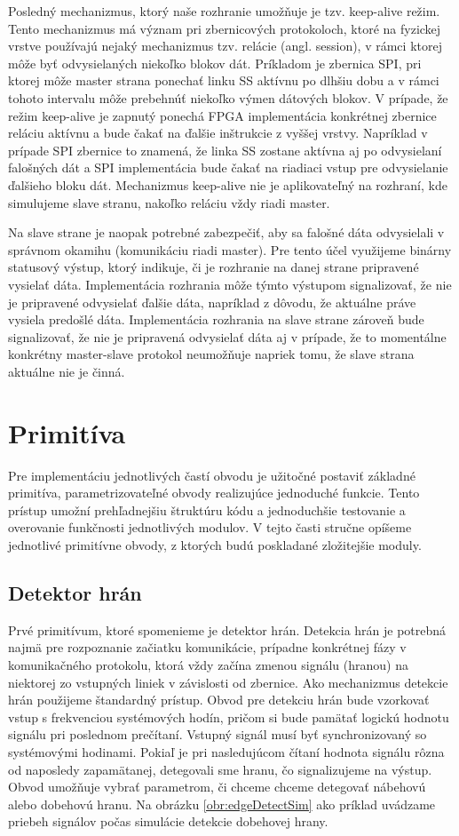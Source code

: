 Posledný mechanizmus, ktorý naše rozhranie umožňuje je tzv. keep-alive režim. Tento mechanizmus má význam pri zbernicových protokoloch, ktoré na fyzickej vrstve používajú nejaký mechanizmus tzv. relácie (angl. session), v rámci ktorej môže byť odvysielaných niekoľko blokov dát. Príkladom je zbernica SPI, pri ktorej môže master strana ponechať linku SS aktívnu po dlhšiu dobu a v rámci tohoto intervalu môže prebehnúť niekoľko výmen dátových blokov. V prípade, že režim keep-alive je zapnutý ponechá FPGA implementácia konkrétnej zbernice reláciu aktívnu a bude čakať na ďalšie inštrukcie z vyššej vrstvy. Napríklad v prípade SPI zbernice to znamená, že linka SS zostane aktívna aj po odvysielaní falošných dát a SPI implementácia bude čakať na riadiaci vstup pre odvysielanie ďalšieho bloku dát. Mechanizmus keep-alive nie je aplikovateľný na rozhraní, kde simulujeme slave stranu, nakoľko reláciu vždy riadi master.

Na slave strane je naopak potrebné zabezpečiť, aby sa falošné dáta odvysielali v správnom okamihu (komunikáciu riadi master). Pre tento účel využijeme binárny statusový výstup, ktorý indikuje, či je rozhranie na danej strane pripravené vysielať dáta. Implementácia rozhrania môže týmto výstupom signalizovať, že nie je pripravené odvysielať ďalšie dáta, napríklad z dôvodu, že aktuálne práve vysiela predošlé dáta. Implementácia rozhrania na slave strane zároveň bude signalizovať, že nie je pripravená odvysielať dáta aj v prípade, že to momentálne konkrétny master-slave protokol neumožňuje napriek tomu, že slave strana aktuálne nie je činná.

\section{Primitíva}
Pre implementáciu jednotlivých častí obvodu je užitočné postaviť základné primitíva, parametrizovateľné obvody realizujúce jednoduché funkcie. Tento prístup umožní prehľadnejšiu štruktúru kódu a jednoduchšie testovanie a overovanie funkčnosti jednotlivých modulov. V tejto časti stručne opíšeme jednotlivé primitívne obvody, z ktorých budú poskladané zložitejšie moduly.

\subsection{Detektor hrán}
Prvé primitívum, ktoré spomenieme je detektor hrán. Detekcia hrán je potrebná najmä pre rozpoznanie začiatku komunikácie, prípadne konkrétnej fázy v komunikačného protokolu, ktorá vždy začína zmenou signálu (hranou) na niektorej zo vstupných liniek v závislosti od zbernice. Ako mechanizmus detekcie hrán použijeme štandardný prístup. Obvod pre detekciu hrán bude vzorkovať vstup s frekvenciou systémových hodín, pričom si bude pamätať logickú hodnotu signálu pri poslednom prečítaní. Vstupný signál musí byť synchronizovaný so systémovými hodinami. Pokiaľ je pri nasledujúcom čítaní hodnota signálu rôzna od naposledy zapamätanej, detegovali sme hranu, čo signalizujeme na výstup. Obvod umožňuje vybrať parametrom, či chceme chceme detegovať nábehovú alebo dobehovú hranu. Na obrázku \ref{obr:edgeDetectSim} ako príklad uvádzame priebeh signálov počas simulácie detekcie dobehovej hrany.

